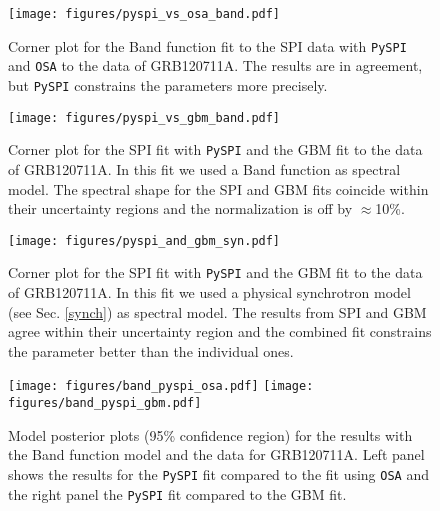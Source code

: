 \documentclass[twocolumn,traditabstract]{aa}
\begin{document}
\begin{figure}
  \begin{centering}
    \texttt{[image: figures/pyspi\_vs\_osa\_band.pdf]}
    \caption{Corner plot for the Band function fit to the SPI data with {\tt PySPI} and {\tt OSA} to the data of GRB120711A. The results are in agreement, but {\tt PySPI} constrains the parameters more precisely.}
    \label{fig:corner_osa_pyspi_band}
  \end{centering}
\end{figure}
\begin{figure}
  \begin{centering}
    \texttt{[image: figures/pyspi\_vs\_gbm\_band.pdf]}
    \caption{Corner plot for the SPI fit with {\tt PySPI} and the GBM fit to the data of GRB120711A. In this fit we used a Band function as spectral model. The spectral shape for the SPI and GBM fits coincide within their uncertainty regions and the normalization is off by $\approx$10\%.}
    \label{fig:corner_gbm_pyspi_band}
  \end{centering}
\end{figure}
\begin{figure}
  \begin{centering}
    \texttt{[image: figures/pyspi\_and\_gbm\_syn.pdf]}
    \caption{Corner plot for the SPI fit with {\tt PySPI} and the GBM fit to the data of GRB120711A. In this fit we used a physical synchrotron model (see Sec. \ref{synch}) as spectral model. The results from SPI and GBM agree within their uncertainty region and the combined fit constrains the parameter better than the individual ones.}
    \label{fig:corner_gbm_pyspi_joined_syn}
  \end{centering}
\end{figure}

\begin{figure*}
  \begin{centering}
    \texttt{[image: figures/band\_pyspi\_osa.pdf]}
    \texttt{[image: figures/band\_pyspi\_gbm.pdf]}
    \caption{Model posterior plots (95\% confidence region) for the results with the Band function model and the data for GRB120711A. Left panel shows the results for the {\tt PySPI} fit compared to the fit using {\tt OSA} and the right panel the {\tt PySPI} fit compared to the GBM fit.}
    \label{fig:model_plot_band}
  \end{centering}
\end{figure*}
\end{document}
